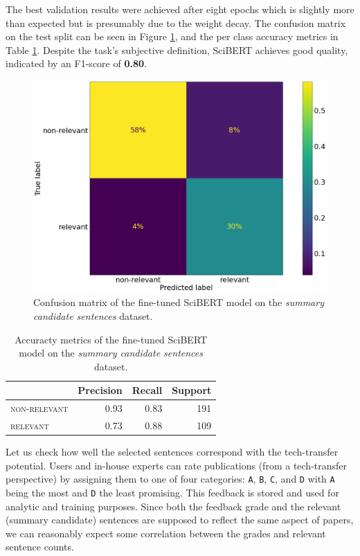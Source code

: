 The best validation results were achieved after eight epochs which is slightly more than expected but is presumably due to the weight decay. The confusion matrix on the test split can be seen in Figure \ref{fig:scibert-confusion}, and the per class accuracy metrics in Table \ref{table:scibert-pr}. Despite the task's subjective definition, SciBERT achieves good quality, indicated by an F1-score of \textbf{0.80}.

\begin{figure}
    \centering
    \includegraphics[width=0.55\linewidth]{figures/scibert-confusion.png}
    \captionsetup{width=.9\linewidth}
    \caption{Confusion matrix of the fine-tuned SciBERT model on the \textit{summary candidate sentences} dataset.}
    \label{fig:scibert-confusion}
\end{figure}

\begin{table}
\centering
\begin{threeparttable}
\caption{Accuracty metrics of the fine-tuned SciBERT model on the \textit{summary candidate sentences} dataset.}
\label{table:scibert-pr}
\setlength{\tabcolsep}{0.75em} %
{\renewcommand{\arraystretch}{1.2} %
\begin{tabular}{|l|r|r|r|}
\hline
{}                    & \textbf{Precision}  & \textbf{Recall}  & \textbf{Support} \\\hline
\textsc{non-relevant} &      0.93           &     0.83         &      191         \\\hline
\textsc{relevant}     &      0.73           &     0.88         &      109         \\\hline
\end{tabular}}
\end{threeparttable}
\end{table}

Let us check how well the selected sentences correspond with the tech-transfer potential. Users and in-house experts can rate publications (from a tech-transfer perspective) by assigning them to one of four categories: \texttt{A}, \texttt{B}, \texttt{C}, and \texttt{D} with \texttt{A} being the most and \texttt{D} the least promising. This feedback is stored and used for analytic and training purposes. Since both the feedback grade and the relevant (summary candidate) sentences are supposed to reflect the same aspect of papers, we can reasonably expect some correlation between the grades and relevant sentence counts.

